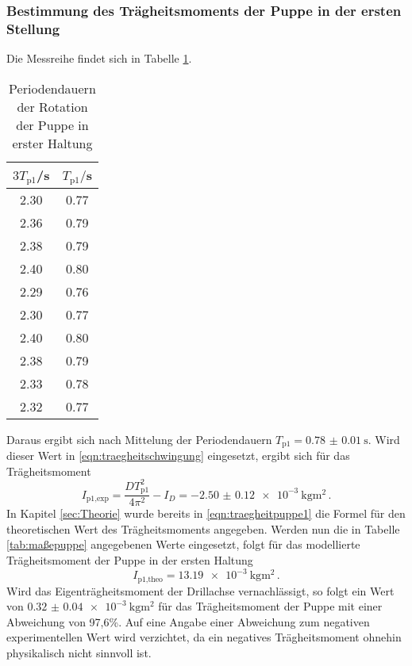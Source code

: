\subsubsection{Bestimmung des Trägheitsmoments der Puppe in der ersten Stellung}
Die Messreihe findet sich in Tabelle \ref{tab:puppe1}.
\begin{table}
\centering
\caption{Periodendauern der Rotation der Puppe in erster Haltung}
\label{tab:puppe1}
\begin{tabular}{c c}
\toprule
$3T_{\text{p1}}$/s & $T_{\text{p1}}/$s \\
\midrule
2.30 & 0.77 \\
2.36 & 0.79 \\
2.38 & 0.79 \\
2.40 & 0.80 \\
2.29 & 0.76 \\
2.30 & 0.77 \\
2.40 & 0.80 \\
2.38 & 0.79 \\
2.33 & 0.78 \\
2.32 & 0.77 \\
\bottomrule
\end{tabular}
\end{table}

Daraus ergibt sich nach Mittelung der Periodendauern
$T_{\text{p1}}=\SI{0.78(001)}{\second}$. Wird dieser Wert in
\eqref{eqn:traegheitschwingung} eingesetzt, ergibt sich für das Trägheitsmoment
\begin{equation}
  I_{\text{p1,exp}} = \frac{DT_{\text{p1}}^2}{4\pi^2}-I_D = \SI{-2.50(012)e-3}{\kilogram\meter\squared}\,.
\end{equation}
In Kapitel \ref{sec:Theorie} wurde bereits in \eqref{eqn:traegheitpuppe1} die
Formel für den theoretischen Wert des Trägheitsmoments angegeben. Werden nun die
in Tabelle \ref{tab:maßepuppe} angegebenen Werte eingesetzt, folgt für das
modellierte Trägheitsmoment der Puppe in der ersten Haltung
\begin{equation}
  I_{\text{p1,theo}} = \SI{13.19e-3}{\kilogram\meter\squared}\,.
\end{equation}
Wird das Eigenträgheitsmoment der Drillachse vernachlässigt, so folgt ein Wert
von $\SI{0.32(004)e-3}{\kilogram\meter\squared}$ für das Trägheitsmoment der
Puppe mit einer Abweichung von 97,6\%.
Auf eine Angabe einer Abweichung zum negativen experimentellen Wert wird
verzichtet, da ein negatives Trägheitsmoment ohnehin physikalisch nicht sinnvoll
ist.
